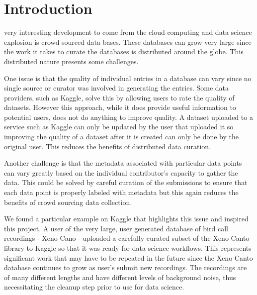 \documentclass[conference,twoside]{IEEEtran}
\begin{document}
\section{Introduction}
%
%
%
%
 very interesting development to come from the cloud computing and data science explosion is crowd sourced data bases. These databases can grow very large since the work it takes to curate the databases is distributed around the globe. This distributed nature presents some challenges.

One issue is that the quality of individual entries in a database can vary since no single source or curator was involved in generating the entries. Some data providers, such as Kaggle\cite{kaggle}, solve this by allowing users to rate the quality of datasets. However this approach, while it does provide useful information to potential users, does not do anything to improve quality. A dataset uploaded to a service such as Kaggle can only be updated by the user that uploaded it so improving the quality of a dataset after it is created can only be done by the original user. This reduces the benefits of distributed data curation.

Another challenge is that the metadata associated with particular data points can vary greatly based on the individual contributor's capacity to gather the data. This could be solved by careful curation of the submissions to ensure that each data point is properly labeled with metadata but this again reduces the benefits of crowd sourcing data collection.

We found a particular example on Kaggle that highlights this issue and inspired this project. A user of the very large, user generated database of bird call recordings - Xeno Cano\cite{xenocanto} - uploaded a carefully curated subset of the Xeno Canto library to Kaggle so that it was ready for data science workflows\cite{xenocantokaggle}. This represents significant work that may have to be repeated in the future since the Xeno Canto database continues to grow as user's submit new recordings. The recordings are of many different lengths and have different levels of background noise, thus necessitating the cleanup step prior to use for data science.
\end{document}
